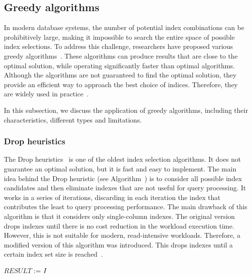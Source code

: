 \subsection{Greedy algorithms}
In modern database systems, the number of potential index combinations can be prohibitively large, making it impossible to search the entire space of possible index selections. To address this challenge, researchers have proposed various greedy algorithms~\citep{Drop,AutoAdmin,Anytime20,Extend}. These algorithms can produce results that are close to the optimal solution, while operating significantly faster than optimal algorithms. Although the algorithms are not guaranteed to find the optimal solution, they provide an efficient way to approach the best choice of indices. Therefore, they are widely used in practice~\citep{Anytime20}.

In this subsection, we discuss the application of greedy algorithms, including their characteristics, different types and limitations.

\subsubsection{Drop heuristics}
The Drop heuristics~\citep{Drop} is one of the oldest index selection algorithms. It does not guarantee an optimal solution, but it is fast and easy to implement. The main idea behind the Drop heuristic (see Algorithm~) is to consider all possible index candidates and then eliminate indexes that are not useful for query processing. It works in a series of iterations, discarding in each iteration the index that contributes the least to query processing performance. The main drawback of this algorithm is that it considers only single-column indexes. The original version drops indexes until there is no cost reduction in the workload execution time. However, this is not suitable for modern, read-intensive workloads. Therefore, a modified version of this algorithm was introduced. This drops indexes until a certain index set size is reached~\citep{IndexSurvey20}.

\begin{algorithm}[!ht]
    \small
    \DontPrintSemicolon
    
    
    $RESULT$ := $I$\;
\;
\caption{Modern Drop Heuristics}
\end{algorithm}

